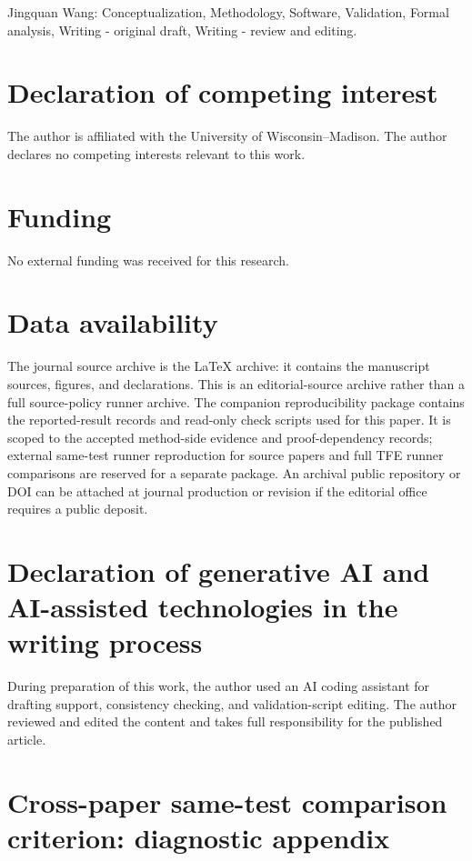 \documentclass[preprint,12pt]{elsarticle}
\newcommand{\tfe}{TFE}
\begin{document}
Jingquan Wang: Conceptualization, Methodology, Software, Validation, Formal
analysis, Writing - original draft, Writing - review and editing.

\section*{Declaration of competing interest}

The author is affiliated with the University of Wisconsin--Madison. The author
declares no competing interests relevant to this work.

\section*{Funding}

No external funding was received for this research.

\section*{Data availability}

The journal source archive is the LaTeX archive: it contains the manuscript
sources, figures, and declarations. This is an editorial-source archive rather
than a full source-policy runner archive.
The companion reproducibility package contains the reported-result records and
read-only check scripts used for this paper. It is scoped to the accepted
method-side evidence and proof-dependency records; external same-test runner
reproduction for source papers and full \tfe{} runner comparisons are reserved
for a separate package. An archival public repository or DOI can be attached
at journal production or revision if the editorial office requires a public
deposit.

\section*{Declaration of generative AI and AI-assisted technologies in the writing process}

During preparation of this work, the author used an AI coding assistant for
drafting support, consistency checking, and validation-script editing. The
author reviewed and edited the content and takes full responsibility for the
published article.

\appendix

\section{Cross-paper same-test comparison criterion: diagnostic appendix}
\label{sec:cross-paper-boundary}
\end{document}
